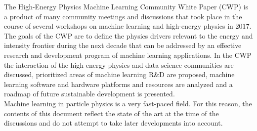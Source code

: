 The High-Energy Physics Machine Learning Community White Paper (CWP) is a product of many community meetings and discussions that took place in the course of several workshops on machine learning and high-energy physics in 2017.\\

The goals of the CWP are to define the physics drivers relevant to the energy and intensity frontier during the next decade that can be addressed by an effective research and development program of machine learning applications.
In the CWP the interaction of the high-energy physics and data science communities are discussed, prioritized areas of machine learning R\&D are proposed, machine learning software and hardware platforms and resources are analyzed and a roadmap of future sustainable development is presented.\\

Machine learning in particle physics is a very fast-paced field.
For this reason, the contents of this document reflect the state of the art at the time of the discussions and do not attempt to take later developments into account.
